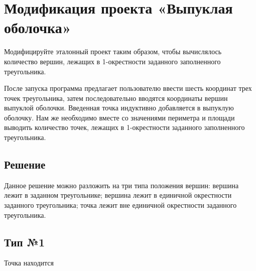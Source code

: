 \section{Модификация проекта «Выпуклая оболочка»}

  Модифицируйте эталонный проект таким образом, чтобы вычислялось количество
вершин, лежащих в 1-окрестности заданного заполненного треугольника.

  После запуска программа предлагает пользователю ввести шесть координат трех 
точек треугольника, затем последовательно вводятся координаты вершин 
выпуклой оболочки. Введенная точка индуктивно добавляется в выпуклую оболочку. Нам 
же необходимо вместе со значениями периметра и площади выводить количество 
точек, лежащих в 1-окрестности заданного заполненного треугольника.
\subsection{Решение}
  Данное решение можно разложить на три типа положения вершин: вершина 
лежит в заданном треугольнике; вершина лежит в единичной окрестности заданного 
треугольника; точка лежит вне единичной окрестности заданного треугольника.
\subsection{Тип №1}
  Точка находится

